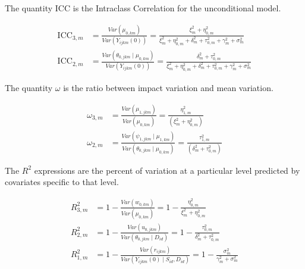 \documentclass[12pt]{article}
\begin{document}
The quantity $\text{ICC}$ is the Intraclass Correlation for the unconditional model.

\begin{align*}
\text{ICC}_{3,m} &= \frac{Var(\mu_{0,km})}{ Var(Y_{ijkm}(0))} = \frac{\xi^2_m + \eta_{0,m}^2}{\xi_m^2 +  \eta^2_{0,m} + \delta_m^2  + \tau^2_{0,m} + \gamma_m^2 + \sigma^2_m}\\
\text{ICC}_{2,m} &= \frac{Var(\theta_{0,jkm} \mid \mu_{0,km})}{ Var(Y_{ijkm}(0))} = \frac{\delta_m^2  + \tau_{0,m}^2}{\xi_m^2 +  \eta^2_{0,m} + \delta_m^2  + \tau^2_{0,m} + \gamma_m^2 + \sigma^2_m}
\end{align*}

The quantity $\omega$ is the ratio between impact variation and mean variation.

\begin{align*}
\omega_{3,m} &=  \frac{Var(\mu_{1,jkm})}{Var(\mu_{0,km})} = \frac{\eta^2_{1,m}}{\left(\xi^2_m + \eta_{0,m}^2\right)}\\
\omega_{2,m} &=  \frac{Var(\psi_{1,jkm} \mid \mu_{1,km})}{Var(\theta_{0,jkm} \mid \mu_{0,km})} = \frac{\tau^2_{1,m}}{\left(\delta_m^2 + \tau^2_{0,m}\right)}
\end{align*}

The $R^2$ expressions are the percent of variation at a particular level predicted by covariates specific to that level.

\begin{align*}
R_{3,m}^2 &= 1 - \frac{Var(w_{0,km})}{Var(\mu_{0,km})} = 1 - \frac{\eta^2_{0,m}}{\xi_m^2 + \eta^2_{0,m}} \\
R_{2,m}^2 &= 1 - \frac{Var(u_{0,jkm})}{Var(\theta_{0,jkm} \mid D_{id})} = 1 - \frac{\tau^2_{0,m}}{\delta_m^2 + \tau^2_{0,m}}\\
R^2_{1,m} &= 1 - \frac{Var(r_{ijkm})}{Var( Y_{ijkm}(0) \mid S_{id}, D_{id})} = 1 - \frac{ \sigma^2_m }{ \gamma_m^2 + \sigma^2_m }
\end{align*}


\end{document}
